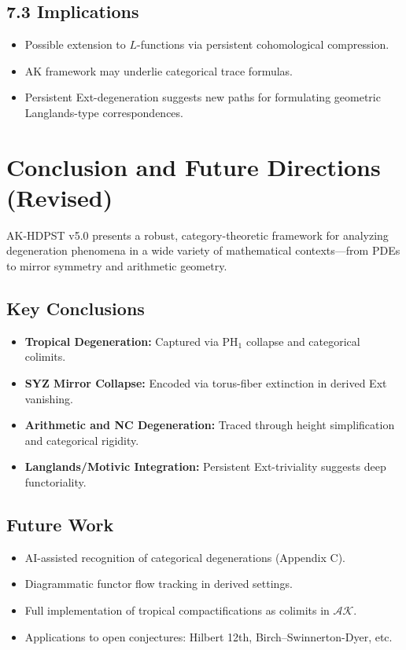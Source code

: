 \documentclass[11pt]{article}
\begin{document}
\subsection{7.3 Implications}

\begin{itemize}
    \item Possible extension to $L$-functions via persistent cohomological compression.
    \item AK framework may underlie categorical trace formulas.
    \item Persistent Ext-degeneration suggests new paths for formulating geometric Langlands-type correspondences.
\end{itemize}



\section{Conclusion and Future Directions (Revised)}

AK-HDPST v5.0 presents a robust, category-theoretic framework for analyzing degeneration phenomena in a wide variety of mathematical contexts—from PDEs to mirror symmetry and arithmetic geometry.

\subsection*{Key Conclusions}
\begin{itemize}
    \item \textbf{Tropical Degeneration:} Captured via PH\(_1\) collapse and categorical colimits.
    \item \textbf{SYZ Mirror Collapse:} Encoded via torus-fiber extinction in derived Ext vanishing.
    \item \textbf{Arithmetic and NC Degeneration:} Traced through height simplification and categorical rigidity.
    \item \textbf{Langlands/Motivic Integration:} Persistent Ext-triviality suggests deep functoriality.
\end{itemize}

\subsection*{Future Work}
\begin{itemize}
    \item AI-assisted recognition of categorical degenerations (Appendix C).
    \item Diagrammatic functor flow tracking in derived settings.
    \item Full implementation of tropical compactifications as colimits in \( \mathcal{AK} \).
    \item Applications to open conjectures: Hilbert 12th, Birch–Swinnerton-Dyer, etc.
\end{itemize}
\end{document}
